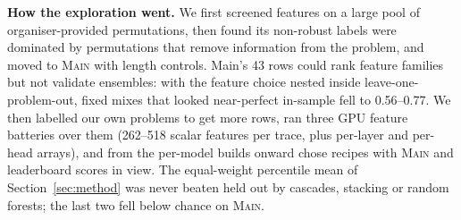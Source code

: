\documentclass{article}
\begin{document}
\textbf{How the exploration went.} We first screened features on a large pool of organiser-provided permutations, then found its non-robust labels were dominated by permutations that remove information from the problem, and moved to \textsc{Main} with length controls. Main's 43 rows could rank feature families but not validate ensembles: with the feature choice nested inside leave-one-problem-out, fixed mixes that looked near-perfect in-sample fell to 0.56--0.77. We then labelled our own problems to get more rows, ran three GPU feature batteries over them (262--518 scalar features per trace, plus per-layer and per-head arrays), and from the per-model builds onward chose recipes with \textsc{Main} and leaderboard scores in view. The equal-weight percentile mean of Section~\ref{sec:method} was never beaten held out by cascades, stacking or random forests; the last two fell below chance on \textsc{Main}.
\end{document}
